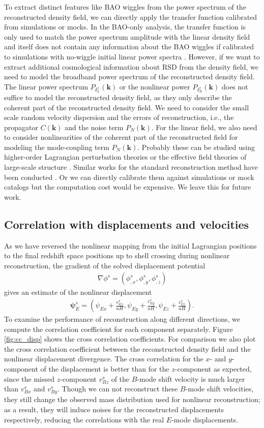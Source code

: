 \documentclass[aps,prd,twocolumn,superscriptaddress,groupedaddress,nofootinbib,amsfont]{revtex4}  %
\newcommand{\bea}{\begin{eqnarray}}
\newcommand{\eea}{\end{eqnarray}}
\newcommand{\bmp}{\bm{\psi}}
\newcommand{\bmk}{\bm{k}}
\begin{document}
To extract distinct features like BAO wiggles from the power spectrum of the
reconstructed density field, we can directly apply the transfer function 
calibrated from simulations or mocks. 
In the BAO-only analysis, the transfer function is only used to match the power 
spectrum amplitude with the linear density field and itself does not contain any
information about the BAO wiggles if calibrated to simulations with 
no-wiggle initial linear power spectra \cite{2017Marcel}.
However, if we want to extract additional cosmological information about RSD 
from the density field, we need to model the broadband power spectrum of the
reconstructed density field. 
The linear power spectrum $P_{\delta_L^s}(\bmk)$ or the nonlinear power $P_{\delta_E^s}(\bmk)$ does not suffice to model the reconstructed density field, as 
they only describe the coherent part of the reconstructed density field. 
We need to consider the small scale random velocity dispersion and the errors of
reconstruction, i.e., the propagator $C(\bmk)$ and the noise term $P_N(\bmk)$.
For the linear field, we also need to consider nonlinearities of the coherent 
part of the reconstructed field for modeling the mode-coupling term $P_N(\bmk)$.
Probably these can be studied using higher-order Lagrangian perturbation theories or the effective field theories of large-scale structure \cite{2016BSZ}.
Similar works for the standard reconstruction method have been conducted \cite{2009PWC,2009NWP,2015marcel,2015Martin,2016Seo,2017CKA}.
Or we can directly calibrate them against simulations or mock catalogs but the
computation cost would be expensive. We leave this for future work.


\subsection{Correlation with displacements and velocities}

As we have reversed the nonlinear mapping from the initial Lagrangian positions
to the final redshift space positions up to shell crossing during nonlinear 
reconstruction, the gradient of the solved displacement potential 
\bea
\nabla\phi^s=(\phi_{,x}^s,\phi_{,y}^s,\phi_{,z}^s)
\eea
gives an estimate of the nonlinear displacement
\bea
\bmp_E^s=(\psi_{Ex}+\frac{v_{Ex}^s}{aH},\psi_{Ey}+\frac{v_{Ey}^s}{aH},\psi_{Ez}+\frac{v_{Ez}^s}{aH}).
\eea
To examine the performance of reconstruction along different directions, we 
compute the correlation coefficient for each component separately. 
Figure \ref{fig:cc_disp} shows the cross correlation coefficients. 
For comparison we also plot the cross correlation coefficient between the 
reconstructed density field and the nonlinear displacement divergence.
The cross correlation for the $x$- and $y$-component of the displacement is
better than for the $z$-component as expected, since the missed $z$-component 
$v_{Bz}^s$ of the $B$-mode shift velocity is much larger than $v_{Bx}^s$ and 
$v_{By}^s$. Though we can not reconstruct these $B$-mode shift velocities, they
still change the observed mass distribution used for nonlinear reconstruction; 
as a result, they will induce noises for the reconstructed displacements 
respectively, reducing the correlations with the real $E$-mode displacements. 
\end{document}
